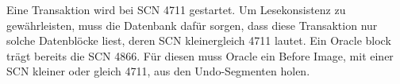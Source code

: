 
            Eine Transaktion wird bei SCN 4711 gestartet. Um Lesekonsistenz zu gew\"ahrleisten, muss die Datenbank daf\"ur sorgen, dass diese Transaktion nur solche Datenbl\"ocke liest, deren SCN kleinergleich 4711 lautet. Ein Oracle block tr\"agt bereits die SCN 4866. F\"ur diesen muss Oracle ein Before Image, mit einer SCN kleiner oder gleich 4711, aus den Undo-Segmenten holen.
